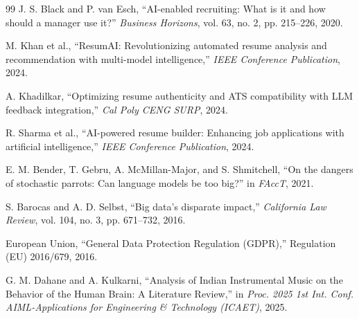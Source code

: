 \documentclass[conference]{IEEEtran}
\begin{document}
\begin{thebibliography}{99}
J. S. Black and P. van Esch, ``AI-enabled recruiting: What is it and how should a manager use it?'' \textit{Business Horizons}, vol. 63, no. 2, pp. 215--226, 2020.

M. Khan et al., ``ResumAI: Revolutionizing automated resume analysis and recommendation with multi-model intelligence,'' \textit{IEEE Conference Publication}, 2024.

A. Khadilkar, ``Optimizing resume authenticity and ATS compatibility with LLM feedback integration,'' \textit{Cal Poly CENG SURP}, 2024.

R. Sharma et al., ``AI-powered resume builder: Enhancing job applications with artificial intelligence,'' \textit{IEEE Conference Publication}, 2024.

E. M. Bender, T. Gebru, A. McMillan-Major, and S. Shmitchell, ``On the dangers of stochastic parrots: Can language models be too big?'' in \textit{FAccT}, 2021.

S. Barocas and A. D. Selbst, ``Big data's disparate impact,'' \textit{California Law Review}, vol. 104, no. 3, pp. 671--732, 2016.

European Union, ``General Data Protection Regulation (GDPR),'' Regulation (EU) 2016/679, 2016.

G. M. Dahane and A. Kulkarni, ``Analysis of Indian Instrumental Music on the Behavior of the Human Brain: A Literature Review,'' in \textit{Proc. 2025 1st Int. Conf. AIML-Applications for Engineering \& Technology (ICAET)}, 2025.

\end{thebibliography}
\end{document}
